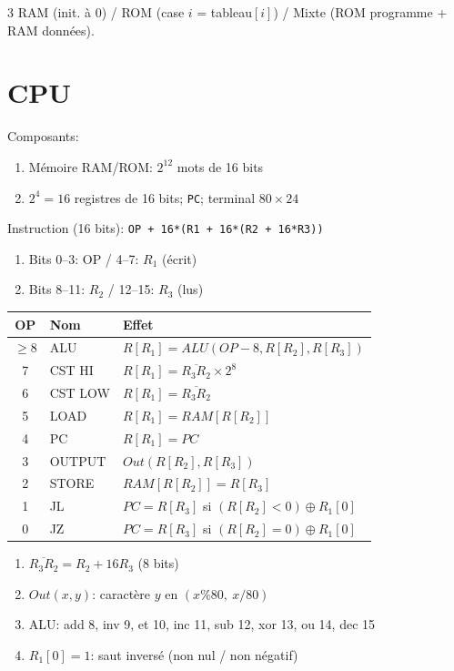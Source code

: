 \documentclass[12pt, a4paper]{article}
\begin{document}
\begin{multicols*}{3}
	RAM (init. à 0) / ROM (case $i$ = tableau$[i]$) / Mixte (ROM programme + RAM données).
 
	\colbreak
	\section{CPU}
	Composants:
	\begin{enumerate}[\roman*.]
		\item Mémoire RAM/ROM: $2^{12}$ mots de 16 bits
		\item $2^4=16$ registres de 16 bits; \lstinline|PC|; terminal $80\times24$
	\end{enumerate}
 
	Instruction (16 bits): \lstinline|OP + 16*(R1 + 16*(R2 + 16*R3))|
	\begin{enumerate}[\roman*.]
		\item Bits 0--3: OP / 4--7: $R_1$ (écrit)
		\item Bits 8--11: $R_2$ / 12--15: $R_3$ (lus)
	\end{enumerate}
 
	\begin{tabular}{|c|l|l|}
		\hline
		\textbf{OP} & \textbf{Nom} & \textbf{Effet}                              \\
		\hline
		$\geq8$     & ALU          & $R[R_1]=ALU(OP{-}8,R[R_2],R[R_3])$          \\
		7           & CST HI       & $R[R_1]=\overline{R_3R_2}\times2^8$         \\
		6           & CST LOW      & $R[R_1]=\overline{R_3R_2}$                  \\
		5           & LOAD         & $R[R_1]=RAM[R[R_2]]$                        \\
		4           & PC           & $R[R_1]=PC$                                 \\
		3           & OUTPUT       & $Out(R[R_2],R[R_3])$                        \\
		2           & STORE        & $RAM[R[R_2]]=R[R_3]$                        \\
		1           & JL           & $PC=R[R_3]$ si $(R[R_2]<0)\oplus R_1[0]$    \\
		0           & JZ           & $PC=R[R_3]$ si $(R[R_2]=0)\oplus R_1[0]$    \\
		\hline
	\end{tabular}
	\begin{enumerate}[\roman*.]
		\item $\overline{R_3R_2}=R_2+16R_3$ (8 bits)
		\item $Out(x,y)$: caractère $y$ en $(x\%80,\ x/80)$
		\item ALU: add 8, inv 9, et 10, inc 11, sub 12, xor 13, ou 14, dec 15
		\item $R_1[0]=1$: saut inversé (non nul / non négatif)
	\end{enumerate}
 

\end{multicols*}
\end{document}

